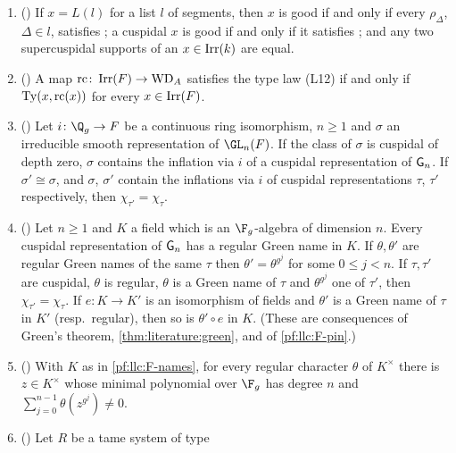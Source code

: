 \begin{enumerate}[label=(F\arabic*),leftmargin=3em]
  $\det_\sigma(V\otimes\xi)=\det_\sigma(V)\,\xi(\sigma)^{\dim V}$; $(V\otimes\xi)\otimes\xi'=V\otimes\xi\xi'$;
  $V\otimes1=V$; $(V\otimes\xi)^\vee=V^\vee\otimes\xi^{-1}$; $V\otimes\xi$ is tame if $V$ is tame and $\xi$ is
  trivial on $P_A$; and if $\dim V>0$ and $V$, $V\otimes\xi$ are both tame, then $\xi$ is trivial on $P_A$.
\item\label{pf:llc:F-goodseg} () If $x=L(l)$ for a list $l$ of
  segments, then $x$ is good if and only if every $\rho_\Delta$, $\Delta\in l$, satisfies \llcGo{}; a cuspidal
  $x$ is good if and only if it satisfies \llcGo{}; and any two supercuspidal supports of an
  $x\in\operatorname{Irr}(k)$ are equal.
\item\label{pf:llc:F-typeiff} () A map
  $\mathrm{rc}\colon\operatorname{Irr}(F)\to\mathrm{WD}_A$ satisfies the type law (L12) if and only if $\operatorname{Ty}(x,\mathrm{rc}(x))$ for
  every $x\in\operatorname{Irr}(F)$.
\item\label{pf:llc:F-typeex} () Let $i\colon\Q_g\to F$ be a continuous
  ring isomorphism, $n\ge1$ and $\sigma$ an irreducible smooth representation of $\GL_n(F)$. If the class of
  $\sigma$ is cuspidal of depth zero, $\sigma$ contains the inflation via $i$ of a cuspidal representation of
  $\mathsf{G}_n$. If $\sigma'\cong\sigma$, and $\sigma$, $\sigma'$ contain the inflations via $i$ of cuspidal
  representations $\tau$, $\tau'$ respectively, then $\chi_{\tau'}=\chi_\tau$.
\item\label{pf:llc:F-names} () Let $n\ge1$ and $K$ a field which is
  an $\F_g$-algebra of dimension $n$. Every cuspidal representation of $\mathsf{G}_n$ has a regular Green name in
  $K$. If $\theta,\theta'$ are regular Green names of the same $\tau$ then $\theta'=\theta^{g^j}$ for some
  $0\le j<n$. If $\tau,\tau'$ are cuspidal, $\theta$ is regular, $\theta$ is a Green name of $\tau$ and
  $\theta^{g^j}$ one of $\tau'$, then $\chi_{\tau'}=\chi_\tau$. If $e\colon K\to K'$ is an isomorphism of fields
  and $\theta'$ is a Green name of $\tau$ in $K'$ (resp.\ regular), then so is $\theta'\circ e$ in $K$.
  (These are consequences of Green's theorem, \cref{thm:literature:green}, and of \ref{pf:llc:F-pin}.)
\item\label{pf:llc:F-pin} () With $K$ as in \ref{pf:llc:F-names}, for
  every regular character $\theta$ of $K^\times$ there is $z\in K^\times$ whose minimal polynomial over $\F_g$
  has degree $n$ and $\sum_{j=0}^{n-1}\theta(z^{g^j})\ne0$.
\item\label{pf:llc:F-tameuniq} () Let $R$ be a tame system of type

\end{enumerate}
